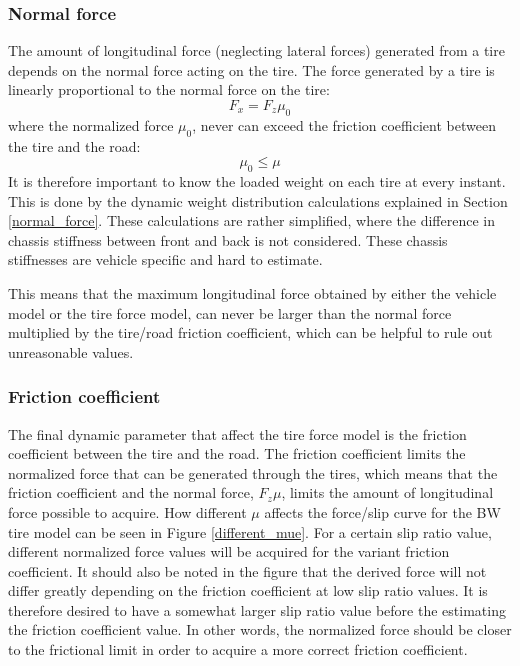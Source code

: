 \subsubsection{Normal force}
The amount of longitudinal force (neglecting lateral forces) generated from a tire depends on the normal force acting on the tire. The force generated by a tire is linearly proportional to the normal force on the tire:
\begin{equation}
	F_{x} = F_{z}\mu_{0}
\end{equation}
where the normalized force $ \mu_{0} $, never can exceed the friction coefficient between the tire and the road:
\begin{equation}
	\mu_{0} \leq \mu
\end{equation}
It is therefore important to know the loaded weight on each tire at every instant. This is done by the dynamic weight distribution calculations explained in Section \ref{normal_force}. These calculations are rather simplified, where the difference in chassis stiffness between front and back is not considered. These chassis stiffnesses are vehicle specific and hard to estimate. 

This means that the maximum longitudinal force obtained by either the vehicle model or the tire force model, can never be larger than the normal force multiplied by the tire/road friction coefficient, which can be helpful to rule out unreasonable values. 

\subsubsection{Friction coefficient}
\label{section_friction coefficient}
The final dynamic parameter that affect the tire force model is the friction coefficient between the tire and the road. The friction coefficient limits the normalized force that can be generated through the tires, which means that the friction coefficient and the normal force, $ F_{z}\mu $, limits the amount of longitudinal force possible to acquire. How different $ \mu $ affects the force/slip curve for the BW tire model can be seen in Figure \ref{different_mue}. For a certain slip ratio value, different normalized force values will be acquired for the variant friction coefficient. It should also be noted in the figure that the derived force will not differ greatly depending on the friction coefficient at low slip ratio values. It is therefore desired to have a somewhat larger slip ratio value before the estimating the friction coefficient value. In other words, the normalized force should be closer to the frictional limit in order to acquire a more correct friction coefficient. 

